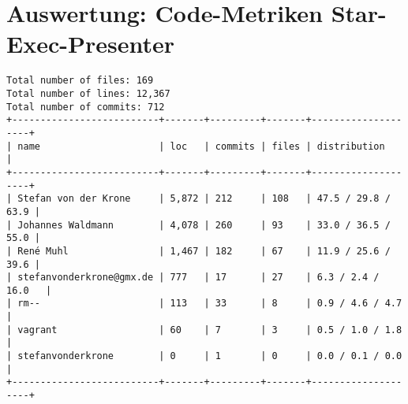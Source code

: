 \section{\texorpdfstring{Auswertung: Code-Metriken Star-Exec-Presenter
\label{appendix:tab:code}}{Auswertung: Code-Metriken Star-Exec-Presenter }}\label{auswertung-code-metriken-star-exec-presenter}

\begin{lstlisting}
Total number of files: 169
Total number of lines: 12,367
Total number of commits: 712
+--------------------------+-------+---------+-------+--------------------+
| name                     | loc   | commits | files | distribution       |
+--------------------------+-------+---------+-------+--------------------+
| Stefan von der Krone     | 5,872 | 212     | 108   | 47.5 / 29.8 / 63.9 |
| Johannes Waldmann        | 4,078 | 260     | 93    | 33.0 / 36.5 / 55.0 |
| René Muhl                | 1,467 | 182     | 67    | 11.9 / 25.6 / 39.6 |
| stefanvonderkrone@gmx.de | 777   | 17      | 27    | 6.3 / 2.4 / 16.0   |
| rm--                     | 113   | 33      | 8     | 0.9 / 4.6 / 4.7    |
| vagrant                  | 60    | 7       | 3     | 0.5 / 1.0 / 1.8    |
| stefanvonderkrone        | 0     | 1       | 0     | 0.0 / 0.1 / 0.0    |
+--------------------------+-------+---------+-------+--------------------+
\end{lstlisting}

